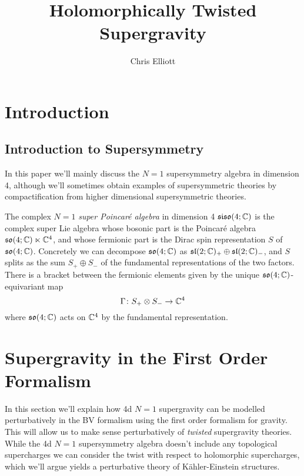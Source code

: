 \documentclass[10pt, oneside]{article}
\title{Holomorphically Twisted Supergravity}
\author{Chris Elliott}
\newcommand{\siso}{\mathfrak{siso}}
\begin{document}
\maketitle

\section{Introduction}


\subsection{Introduction to Supersymmetry}
In this paper we'll mainly discuss the $N=1$ supersymmetry algebra in dimension 4, although we'll sometimes obtain examples of supersymmetric theories by compactification from higher dimensional supersymmetric theories.

\begin{definition}
The complex $N=1$ \emph{super Poincar\'e algebra} in dimension 4 $\siso(4;\CC)$ is the complex super Lie algebra whose bosonic part is the Poincar\'e algebra $\mathfrak{so}(4;\mathbb{C}) \ltimes \mathbb{C}^4$, and whose fermionic part is the Dirac spin representation $S$ of $\mathfrak{so}(4;\mathbb{C})$.  Concretely we can decompose $\mathfrak{so}(4;\mathbb{C})$ as $\mathfrak{sl}(2;\mathbb{C})_+ \oplus \mathfrak{sl}(2;\mathbb{C})_-$, and $S$ splits as the sum $S_+ \oplus S_-$ of the fundamental representations of the two factors.  There is a bracket between the fermionic elements given by the unique $\mathfrak{so}(4;\mathbb{C})$-equivariant map
\[\Gamma \colon S_+ \otimes S_- \to \mathbb{C}^4\]
where $\mathfrak{so}(4;\mathbb{C})$ acts on $\mathbb{C}^4$ by the fundamental representation.
\end{definition}


\section{Supergravity in the First Order Formalism}
In this section we'll explain how 4d $N=1$ supergravity can be modelled perturbatively in the BV formalism using the first order formalism for gravity.  This will allow us to make sense perturbatively of \emph{twisted} supergravity theories.  While the 4d $N=1$ supersymmetry algebra doesn't include any topological supercharges we can consider the twist with respect to holomorphic supercharges, which we'll argue yields a perturbative theory of K\"ahler-Einstein structures.
\end{document}

